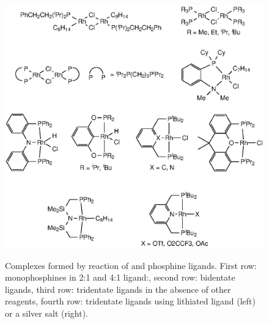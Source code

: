 \begin{figure}[h!]
\begin{center}
\vspace{0.5cm}
\includegraphics{../Figures/RhCOEClcomplexes.eps}
\caption[Complexes formed by reaction of  and phosphine ligands]{Complexes formed by reaction of  and phosphine ligands.  First row: monophosphines in 2:1 and 4:1 ligand:, second row: bidentate ligands, third row: tridentate ligands in the absence of other reagents, fourth row: tridentate ligands using lithiated ligand (left) or a silver salt (right).}
\vspace{0.2cm}
\label{RhcoeClcomplexes}
\end{center}
\end{figure}
\vspace{0.2cm}

